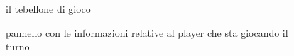 \begin{figure}[H]
    \centering
    \caption{il tebellone di gioco}
	\label{img:gamescreen4}
\end{figure}
\begin{figure}[H]
    \centering
    \caption{pannello con le informazioni relative al player che sta giocando il turno}
	\label{img:gamescreen5}
\end{figure}
